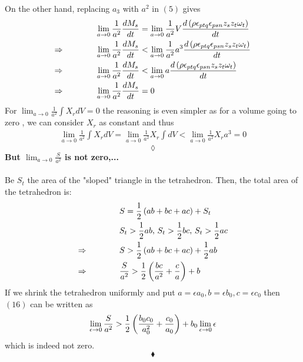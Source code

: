On the other hand, replacing $a_3$ with $a^2$ in $(5)$ gives 
\begin{align}
&\lim_{a \to 0} \frac{1}{a^2}\dv{M_s}{t} = \lim_{a \to 0}\frac{1}{a^2}V\dv{\left(\rho\epsilon_{ptq}\epsilon_{psn}z_sz_t\omega_t\right)}{t} \\
\Rightarrow\quad\quad\quad\quad &\lim_{a \to 0} \frac{1}{a^2}\dv{M_s}{t} < \lim_{a \to 0}\frac{1}{a^2}a^3\dv{\left(\rho\epsilon_{ptq}\epsilon_{psn}z_sz_t\omega_t\right)}{t} \\
\Rightarrow\quad\quad\quad\quad &\lim_{a \to 0} \frac{1}{a^2}\dv{M_s}{t} < \lim_{a \to 0}a\dv{\left(\rho\epsilon_{ptq}\epsilon_{psn}z_sz_t\omega_t\right)}{t}\\
\Rightarrow\quad\quad\quad\quad &\lim_{a \to 0} \frac{1}{a^2}\dv{M_s}{t} =0
\end{align}
For $ \displaystyle \lim_{a \to 0} \frac{1}{a^2} \int X_rdV=0$ the reasoning is even simpler as for a volume going to zero , we can consider $X_r$ as constant and thus 
\begin{align}
 \displaystyle \lim_{a \to 0} \frac{1}{a^2} \int X_rdV=\displaystyle \lim_{a \to 0} \frac{1}{a^2}  X_r \int dV < \displaystyle \lim_{a \to 0} \frac{1}{a^2}  X_r a^3 = 0
\end{align}
$$\lozenge$$
\textbf{But  $\displaystyle \lim_{a \to 0} \frac{S}{a^2}$ is not zero,...}\\\\
Be $S_t$ the area of the "sloped" triangle in the tetrahedron. Then, the total area of the tetrahedron is:
\begin{align}
&S= \frac{1}{2}\left(ab + bc + ac \right) + S_t\\
&S_t > \frac{1}{2} ab\text{,   }S_t > \frac{1}{2} bc\text{,   }S_t > \frac{1}{2} ac\\
\Rightarrow \quad\quad\quad\quad & S>  \frac{1}{2}\left(ab + bc + ac \right) + \frac{1}{2} ab\\
\Rightarrow \quad\quad\quad\quad & \frac{S}{a^2}>  \frac{1}{2}\left( \frac{bc}{a^2} + \frac{c}{a} \right) + b
\end{align}
If we shrink the tetrahedron uniformly and put $a=\epsilon a_0, b=\epsilon b_0, c=\epsilon c_0$ then $(16)$ can be written as 
\begin{align}
\lim_{\epsilon \to 0}\frac{S}{a^2}>   \frac{1}{2}\left( \frac{b_0c_0}{a_0^2} + \frac{c_0}{a_0} \right) + b_0\lim_{\epsilon \to 0}\epsilon 
\end{align}
which is indeed not zero.
 $$\blacklozenge$$
\newpage


